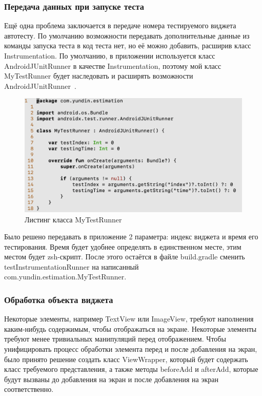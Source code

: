 \documentclass[a4paper,14pt]{extarticle} %
\begin{document}
	\subsubsection{Передача данных при запуске теста}
	
	
	Ещё одна проблема заключается в передаче номера тестируемого виджета автотесту. По умолчанию возможности передавать дополнительные данные из команды запуска теста в код теста нет, но её можно добавить, расширив класс Instrumentation. По умолчанию, в приложении используется класс AndroidJUnitRunner в качестве Instrumentation, поэтому мой класс MyTestRunner будет наследовать и расширять возможности AndroidJUnitRunner~\ris{\ref{fig:mytestrunner}}.
	
	\begin{figure}[tbh]
		\includegraphics[width=\textwidth]{mytestrunner}
		\caption{Листинг класса MyTestRunner}
		\label{fig:mytestrunner}
	\end{figure}
	
	Было решено передавать в приложение 2 параметра: индекс виджета и время его тестирования. Время будет удобнее определять в единственном месте, этим местом будет zsh-скрипт. После этого остаётся в файле build.gradle сменить testInstrumentationRunner на написанный com.yundin.estimation.MyTestRunner.
	
	\subsubsection{Обработка объекта виджета}
	
	Некоторые элементы, например TextView или ImageView, требуют наполнения каким-нибудь содержимым, чтобы отображаться на экране. Некоторые элементы требуют менее тривиальных манипуляций перед отображением. Чтобы унифицировать процесс обработки элемента перед и после добавления на экран, было принято решение создать класс ViewWrapper, который будет содержать класс требуемого представления, а также методы beforeAdd и afterAdd, которые будут вызваны до добавления на экран и после добавления на экран соответственно.
	
\end{document}
